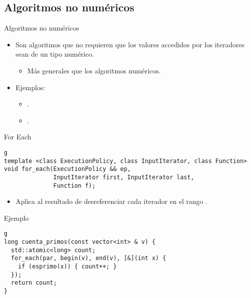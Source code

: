 \subsection{Algoritmos no numéricos}

\begin{frame}[t]{Algoritmos no numéricos}
\begin{itemize}
  \item Son algoritmos que no requieren que los valores accedidos por
        los iteradores sean de un tipo numérico.
    \begin{itemize}
      \item Más generales que los algoritmos numéricos.
    \end{itemize}
  \item Ejemplos:
    \begin{itemize}
      \item {}.
      \item {}.
    \end{itemize}
\end{itemize}
\end{frame}

\begin{frame}[t,fragile]{For Each}
\begin{lstlisting}g
template <class ExecutionPolicy, class InputIterator, class Function>
void for_each(ExecutionPolicy && ep, 
              InputIterator first, InputIterator last,
              Function f);
\end{lstlisting}
\begin{itemize}
  \item Aplica  al resultado de desreferenciar cada iterador en el rango \cppid{[first,last)}.
\end{itemize}
\begin{block}{Ejemplo}
\begin{lstlisting}g
long cuenta_primos(const vector<int> & v) {
  std::atomic<long> count;
  for_each(par, begin(v), end(v), [&](int x) {
    if (esprimo(x)) { count++; }
  });
  return count;
}
\end{lstlisting}
\end{block}
\end{frame}

